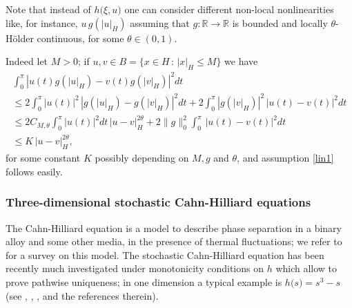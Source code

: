 \documentclass[preprint]{imsart}
\def\R{\mathbb R}
\begin{document}
{ Note that instead of ${   h( }\xi, u)$ one can consider different non-local nonlinearities like, for instance, $u   \, g(|u|_H)$ assuming that $g: \R \to \R$ is bounded and  locally $\theta$-H\"older continuous, for some $\theta \in (0,1)$. }

Indeed let $M>0$; if $u,v \in B =\{ x \in H \, :\, |x|_H \le M \}$ we have 
\begin{gather} \nonumber
\int_0^{ \pi} |u(t) g(|u|_H) - v(t) g(|v|_H)|^2 dt \\ 
\nonumber \le 
2 \int_0^{ \pi} |u(t)|^2 \, |g(|u|_H) - g(|v|_H)|^2 dt +  2 \int_0^{ \pi} |g(|v|_H)|^2
\, |u(t)  - v(t) |^2 dt
\\ \nonumber \le 
2 C_{M, \theta}\int_0^{ \pi} |u(t)|^2 dt \, | u - v |^{2\theta}_H  +  2 \|g \|_0^2 \int_0^{\pi} 
\, |u(t)  - v(t) |^2 dt
\\  \label{bene} 
\le K  \, | u - v |^{2\theta}_H,
\end{gather}
for some constant $K$ possibly depending on $M, g $ and $\theta$, and   assumption \eqref{lin1} follows easily. 
     
 
    
    
\subsubsection{ Three-dimensional stochastic Cahn-Hilliard equations      
}  

 The  Cahn-Hilliard equation is a  model to describe phase separation in a binary alloy and some other media, in the presence of thermal fluctuations; 
  we refer to \cite{NC} for a survey
 on this model. The stochastic Cahn-Hilliard equation
  has been recently much investigated  under monotonicity conditions on $h$ which allow to prove pathwise uniqueness; in one dimension a typical example is ${   h( }s) = s^3 -s$  (see \cite{EM}, \cite{DD}, \cite{NC}, \cite{ES} and the references therein).   
 
\end{document}
